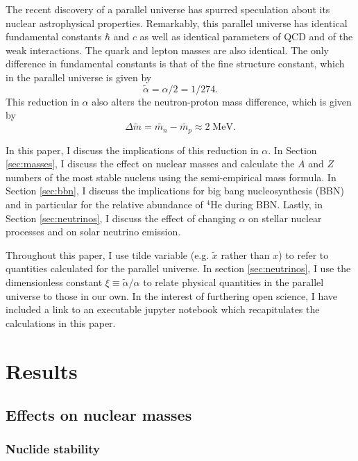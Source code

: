 \documentclass[%
 reprint,
 amsmath,amssymb,
 aps,
]{revtex4-1}
\begin{document}
The recent discovery of a parallel universe\cite{ReddyMidterm} has spurred speculation about its nuclear astrophysical properties. Remarkably, this parallel universe has identical fundamental constants $\hbar$ and $c$ as well as identical parameters of QCD and of the weak interactions. The quark and lepton masses are also identical. The only difference in fundamental constants is that of the fine structure constant, which in the parallel universe is given by
\begin{equation}
	\widetilde{\alpha} = \alpha / 2 = 1 / 274.
\end{equation}
This reduction in $\alpha$ also alters the neutron-proton mass difference, which is given by\cite{ReddyMidterm}
\begin{equation}
	\Delta \widetilde{m} = \widetilde{m_n} - \widetilde{m_p} \approx 2 \; \text{MeV}.
\end{equation}

In this paper, I discuss the implications of this reduction in $\alpha$. In Section \ref{sec:masses}, I discuss the effect on nuclear masses and calculate the $A$ and $Z$ numbers of the most stable nucleus using the semi-empirical mass formula. In Section \ref{sec:bbn}, I discuss the implications for big bang nucleosynthesis (BBN) and in particular for the relative abundance of ${}^4\text{He}$ during BBN. Lastly, in Section \ref{sec:neutrinos}, I discuss the effect of changing $\alpha$ on stellar nuclear processes and on solar neutrino emission.

Throughout this paper, I use tilde variable (e.g. $\widetilde{x}$ rather than $x$) to refer to quantities calculated for the parallel universe. In section \ref{sec:neutrinos}, I use the dimensionless constant $\xi \equiv \widetilde{\alpha} / \alpha$ to relate physical quantities in the parallel universe to those in our own. In the interest of furthering open science, I have included a link to an executable jupyter notebook\cite{jupyter_notebook} which recapitulates the calculations in this paper.

\section{\label{sec:results}Results}

\subsection{\label{sec:masses}Effects on nuclear masses}

\subsubsection{\label{sec:table_of_nuclides}Nuclide stability}
\end{document}
